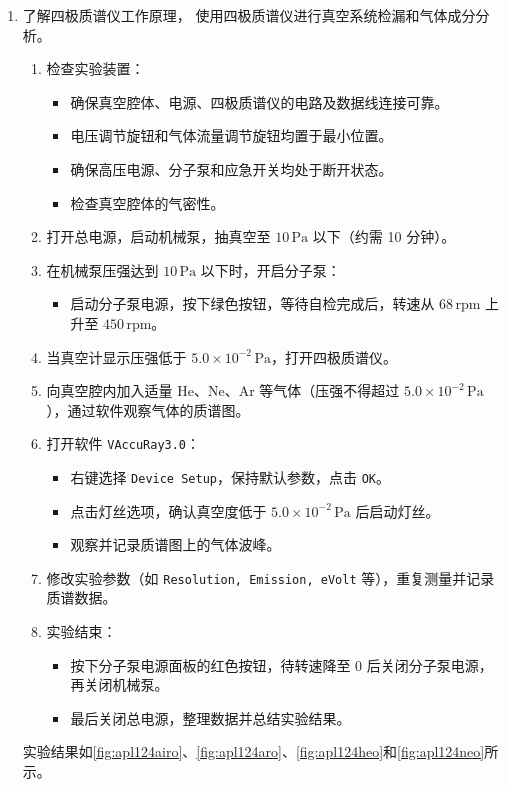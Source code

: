 \begin{enumerate}
	\item 了解四极质谱仪工作原理， 使用四极质谱仪进行真空系统检漏和气体成分分析。
	\begin{enumerate}
		\item 检查实验装置：
		\begin{itemize}
			\item 确保真空腔体、电源、四极质谱仪的电路及数据线连接可靠。
			\item 电压调节旋钮和气体流量调节旋钮均置于最小位置。
			\item 确保高压电源、分子泵和应急开关均处于断开状态。
			\item 检查真空腔体的气密性。
		\end{itemize}
		\item 打开总电源，启动机械泵，抽真空至 $10 \, \mathrm{Pa}$ 以下（约需 10 分钟）。
		\item 在机械泵压强达到 $10 \, \mathrm{Pa}$ 以下时，开启分子泵：
		\begin{itemize}
			\item 启动分子泵电源，按下绿色按钮，等待自检完成后，转速从 $68 \, \mathrm{rpm}$ 上升至 $450 \, \mathrm{rpm}$。
		\end{itemize}
		\item 当真空计显示压强低于 $5.0 \times 10^{-2} \, \mathrm{Pa}$，打开四极质谱仪。
		\item 向真空腔内加入适量 He、Ne、Ar 等气体（压强不得超过 $5.0 \times 10^{-2} \, \mathrm{Pa}$），通过软件观察气体的质谱图。
		\item 打开软件 \texttt{VAccuRay3.0}：
		\begin{itemize}
			\item 右键选择 \texttt{Device Setup}，保持默认参数，点击 \texttt{OK}。
			\item 点击灯丝选项，确认真空度低于 $5.0 \times 10^{-2} \, \mathrm{Pa}$ 后启动灯丝。
			\item 观察并记录质谱图上的气体波峰。
		\end{itemize}
		\item 修改实验参数（如 \texttt{Resolution, Emission, eVolt} 等），重复测量并记录质谱数据。
		\item 实验结束：
		\begin{itemize}
			\item 按下分子泵电源面板的红色按钮，待转速降至 0 后关闭分子泵电源，再关闭机械泵。
			\item 最后关闭总电源，整理数据并总结实验结果。
		\end{itemize}
	\end{enumerate}
	
	实验结果如\cref{fig:apl124airo}、\cref{fig:apl124aro}、\cref{fig:apl124heo}和\cref{fig:apl124neo}所示。
	
\end{enumerate}	

